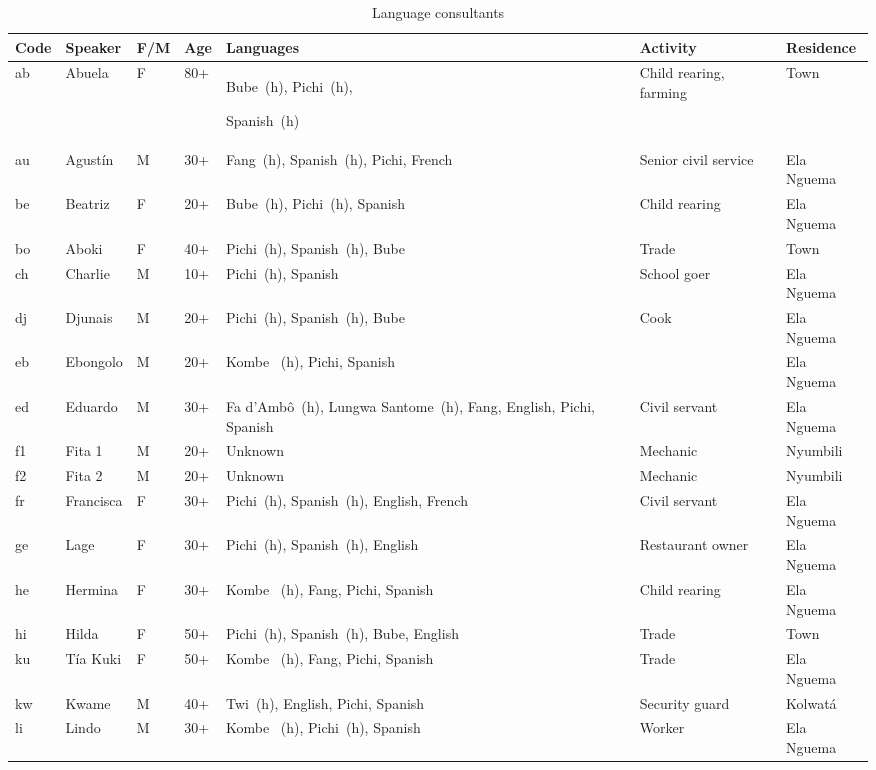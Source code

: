 \begin{longtable}{>{\footnotesize}l@{~}>{\footnotesize}l@{~} >{\footnotesize}l@{~}>{\footnotesize}l >{\footnotesize\raggedright}p{3cm} >{\footnotesize\raggedright}p{2cm} >{\footnotesize}l}
\caption{Language consultants}\label{tab:1:1.1}
\\
\lsptoprule

Code & Speaker & F/M & Age & Languages & Activity & Residence\\
\midrule\endhead
ab & Abuela & \textsc{F} & 80+ & Bube~(h), Pichi~(h), 

Spanish~(h) & Child rearing, farming & Town\\
au & Agustín & M & 30+ & Fang~(h), Spanish~(h), Pichi, French & Senior civil service & Ela Nguema\\
be & Beatriz & \textsc{F} & 20+ & Bube~(h), Pichi~(h), Spanish & Child rearing & Ela Nguema\\
bo & Aboki & \textsc{F} & 40+ & Pichi~(h), Spanish~(h), Bube & Trade & Town\\
ch & Charlie & M & 10+ & Pichi~(h), Spanish & School goer & Ela Nguema\\
dj & Djunais & M & 20+ & Pichi~(h), Spanish~(h), Bube & Cook & Ela Nguema\\
eb & Ebongolo & M & 20+ & Kombe ~(h), Pichi, Spanish &  & Ela Nguema\\
ed & Eduardo & M & 30+ & Fa d’Ambô~(h), Lungwa Santome~(h), Fang, English, Pichi, Spanish & Civil servant & Ela Nguema\\
f1 & Fita 1 & M & 20+ & Unknown & Mechanic & Nyumbili\\
f2 & Fita 2 & M & 20+ & Unknown & Mechanic & Nyumbili\\
fr & Francisca & \textsc{F} & 30+ & Pichi~(h), Spanish~(h), English, French & Civil servant & Ela Nguema\\
ge & Lage & \textsc{F} & 30+ & Pichi~(h), Spanish~(h), English & Restaurant owner & Ela Nguema\\
he & Hermina & \textsc{F} & 30+ & Kombe ~(h), Fang, Pichi, Spanish & Child rearing & Ela Nguema\\
hi & Hilda & \textsc{F} & 50+ & Pichi~(h), Spanish~(h), Bube, English & Trade & Town\\
ku & Tía Kuki & \textsc{F} & 50+ & Kombe ~(h), Fang, Pichi, Spanish & Trade & Ela Nguema\\
kw & Kwame & M & 40+ & Twi~(h), English, Pichi, Spanish & Security guard & Kolwatá\\
li & Lindo & M & 30+ & Kombe ~(h), Pichi~(h), Spanish & Worker & Ela Nguema\\

\end{longtable}
